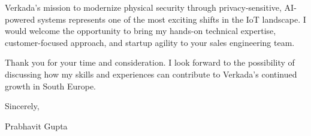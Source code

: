 \documentclass[11pt,a4paper]{article}
\begin{document}
\vspace{0.5cm}
\noindent Verkada’s mission to modernize physical security through privacy-sensitive, AI-powered systems represents one of the most exciting shifts in the IoT landscape. I would welcome the opportunity to bring my hands-on technical expertise, customer-focused approach, and startup agility to your sales engineering team.

\vspace{0.5cm}
\noindent Thank you for your time and consideration. I look forward to the possibility of discussing how my skills and experiences can contribute to Verkada's continued growth in South Europe.

\vspace{0.5cm}
\noindent Sincerely,

\vspace{0.5cm}
\noindent Prabhavit Gupta
\end{document}
